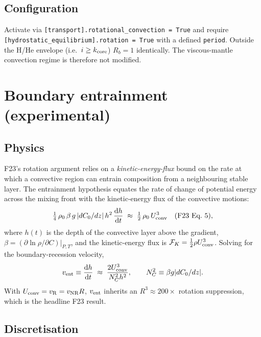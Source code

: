 \documentclass{aastex631}
\newcommand{\dd}{\mathrm{d}}
\newcommand{\VNR}{v_{\rm NR}}
\newcommand{\VR}{v_{\rm R}}
\newcommand{\Vconv}{U_{\rm conv}}
\newcommand{\NCsq}{N_C^2}
\begin{document}
\subsection{Configuration}

Activate via
\texttt{[transport].rotational\_convection = True} and require
\texttt{[hydrostatic\_equilibrium].rotation = True} with a defined
\texttt{period}.  Outside the H/He envelope (i.e.\ $i \ge k_{\rm core}$)
$R_b = 1$ identically.  The viscous-mantle convection regime is
therefore not modified.

\section{Boundary entrainment (experimental)}\label{sec:entrainment}

\subsection{Physics}

F23's rotation argument relies on a \emph{kinetic-energy-flux} bound
on the rate at which a convective region can entrain composition from
a neighbouring stable layer.  The \citet{Linden1975} entrainment
hypothesis equates the rate of change of potential energy across the
mixing front with the kinetic-energy flux of the convective motions:
\begin{equation}
\tfrac{1}{4}\, \rho_0\, \beta\, g\, |dC_0/dz|\, h^2\, \frac{\dd h}{\dd t}
    \;\approx\; \tfrac{1}{2}\,\rho_0\, \Vconv^3
    \quad\text{(F23 Eq.~5)},
\label{eq:F23-eq5}
\end{equation}
where $h(t)$ is the depth of the convective layer above the gradient,
$\beta = (\partial \ln \rho /\partial C)|_{P,T}$, and the kinetic-energy
flux is $\mathcal{F}_K = \tfrac{1}{2}\rho \Vconv^3$.  Solving for the
boundary-recession velocity,
\begin{equation}
v_{\rm ent} \equiv \frac{\dd h}{\dd t}
    \;\approx\; \frac{2\Vconv^3}{\NCsq h^2},
\quad\quad
\NCsq \equiv \beta g |dC_0/dz|.
\label{eq:vent}
\end{equation}
With $\Vconv = \VR = \VNR R$, $v_{\rm ent}$ inherits an $R^3 \approx
200\times$ rotation suppression, which is the headline F23 result.

\subsection{Discretisation}
\end{document}
